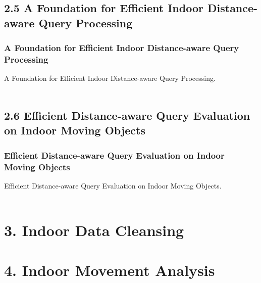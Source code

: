 \documentclass{beamer}
\begin{document}

\subsection{2.5 A Foundation for Efficient Indoor Distance-aware Query Processing} %

\begin{frame}
\frametitle{A Foundation for Efficient Indoor Distance-aware Query Processing}
A Foundation for Efficient Indoor Distance-aware Query Processing.~\cite{DBLP:conf/icde/LuCJ12}\\~\\


\end{frame}


\subsection{2.6 Efficient Distance-aware Query Evaluation on Indoor Moving Objects} %

\begin{frame}
\frametitle{Efficient Distance-aware Query Evaluation on Indoor Moving Objects}
Efficient Distance-aware Query Evaluation on Indoor Moving Objects.~\cite{DBLP:conf/icde/XieLP13}\\~\\


\end{frame}

\section{3. Indoor Data Cleansing} %

\section{4. Indoor Movement Analysis} %
\end{document}
